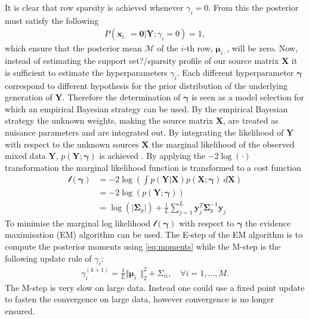 It is clear that row sparsity is achieved whenever $\gamma_i = 0$. 
From this the posterior must satisfy the following 
\begin{align*}
P(\mathbf{x}_{i \cdot} = \mathbf{0} \vert \mathbf{Y} ; \gamma_i = 0) = 1,
\end{align*}
which ensure that the posterior mean $\mathcal{M}$ of the $i$-th row, $\boldsymbol{\mu}_{i \cdot}$, will be zero. Now, instead of estimating the support set?/sparsity profile of our source matrix $\mathbf{X}$ it is sufficient to estimate the hyperparameters $\gamma_i$\cite[p. 147]{phd_wipf}.
Each different hyperparameter $\boldsymbol{\gamma}$ correspond to different hypothesis for the prior distribution of the underlying generation of $\mathbf{Y}$. Therefore the determination of $\boldsymbol{\gamma}$ is seen as a model selection for which an empirical Bayesian strategy can be used. 
By the empirical Bayesian strategy the unknown weights, making the source matrix $\textbf{X}$, are treated as nuisance parameters and are integrated out.
By integrating the likelihood of $\textbf{Y}$ with respect to the unknown sources $\mathbf{X}$ the marginal likelihood of the observed mixed data $\mathbf{Y}$, $p (\mathbf{Y} ; \boldsymbol{\gamma})$ is achieved \cite[p. 146]{phd_wipf}. 
By applying the $-2 \log (\cdot)$ transformation the marginal likelihood function is transformed to a cost function
\begin{align*}
\mathcal{l}(\boldsymbol{\gamma}) &= -2 \log \left( \int p (\mathbf{Y}  \vert \mathbf{X}) p (\mathbf{X} ; \boldsymbol{\gamma}) \ d\mathbf{X} \right) \\
&= - 2 \log(p (\mathbf{Y} ; \boldsymbol{\gamma}))\\
&= \log ( \vert \boldsymbol{\Sigma}_y \vert) + \frac{1}{L} \sum_{j=1}^L \mathbf{y}_{j}^T \boldsymbol{\Sigma}_y ^{-1} \mathbf{y}_{j}
\end{align*}
To minimise the marginal log likelihood $\mathcal{l}(\boldsymbol{\gamma})$ with respect to $\boldsymbol{\gamma}$ the evidence maximisation (EM) algorithm can be used. 
The E-step of the EM algorithm is to compute the posterior moments using \eqref{eq:moments} while the M-step is the following update rule of $\gamma_i$:
\begin{align*}
\gamma_i^{(k+1)} = \frac{1}{L} \Vert \boldsymbol{\mu}_{i \cdot} \Vert_2^2 + \Sigma_{ii}, \quad \forall i = 1, \dots, M.
\end{align*}
The M-step is very slow on large data. 
Instead one could use a fixed point update to fasten the convergence on large data, however convergence is no longer ensured. 
